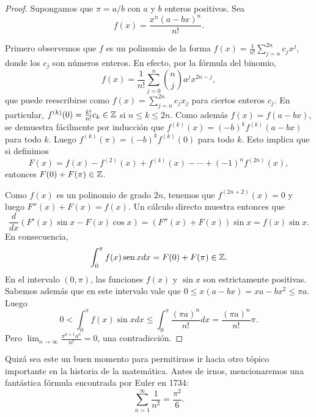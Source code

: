 \begin{proof}
	Supongamos que $\pi=a/b$ con $a$ y $b$ enteros positivos. Sea 
	\[
		f(x)=\frac{x^n(a-bx)^n}{n!}.
	\]

	Primero observemos que $f$ es un polinomio de la forma
	$f(x)=\frac{1}{n!}\sum_{j=n}^{2n}c_jx^j$, donde los $c_j$ son números
	enteros. En efecto, por la fórmula del binomio, 
	\[
		f(x)=\frac{1}{n!}\sum_{j=0}^n\binom{n}{j}a^jx^{2n-j},
	\]
	que puede reescribirse como $f(x)=\sum_{j=n}^{2n}c_jx_j$ para ciertos
	enteros $c_j$.  En particular, $f^{(k)}(0)=\frac{k!}{n!}c_k\in\mathbb{Z}$ si $n\leq
	k\leq 2n$. Como además $f(x)=f(a-bx)$, se demuestra fácilmente por
	inducción que $f^{(k)}(x)=(-b)^kf^{(k)}(a-bx)$ para todo $k$. Luego
	$f^{(k)}(\pi)=(-b)^kf^{(k)}(0)$ para todo $k$. Esto implica que si definimos 
	\[
	F(x)=f(x)-f^{(2)}(x)+f^{(4)}(x)-\cdots+(-1)^nf^{(2n)}(x), 
	\]
	entonces $F(0)+F(\pi)\in\mathbb{Z}$. 

	Como $f(x)$ es un polinomio de grado $2n$, tenemos que $f^{(2n+2)}(x)=0$ y
	luego $F''(x)+F(x)=f(x)$.  Un cálculo directo muestra entonces que
	\[
		\frac{d}{dx}\left( F'(x)\sin x-F(x)\cos x\right)=(F''(x)+F(x))\sin x=f(x)\sin x.
	\]
	En consecuencia, 
	\[
		\int_0^\pi f(x)\operatorname{sen} xdx=F(0)+F(\pi)\in\mathbb{Z}.
	\]
	En el intervalo $(0,\pi)$, las funciones $f(x)$ y $\sin x$ son estrictamente positivas.
	Sabemos además que en este intervalo vale que $0\leq x(a-bx)=xa-bx^2\leq
	\pi a$. 
	Luego
	\[
		0<\int_0^\pi f(x)\sin xdx\leq \int_0^\pi \frac{(\pi a)^n}{n!}dx=\frac{(\pi a)^n}{n!}\pi.
	\]
	Pero $\displaystyle{\lim_{n\to\infty}\frac{\pi^{n+1}a^n}{n!}=0}$, una contradicción.
\end{proof}


Quizá sea este un buen momento para permitirnos ir hacia otro tópico importante
en la historia de la matemática. Antes de irnos, mencionaremos una fantástica
fórmula encontrada por Euler en 1734: 
\begin{equation}
	\label{eq:pi^2/6}
\sum_{n=1}^{\infty}\frac{1}{n^2}=\frac{\pi^2}{6}.
\end{equation}

